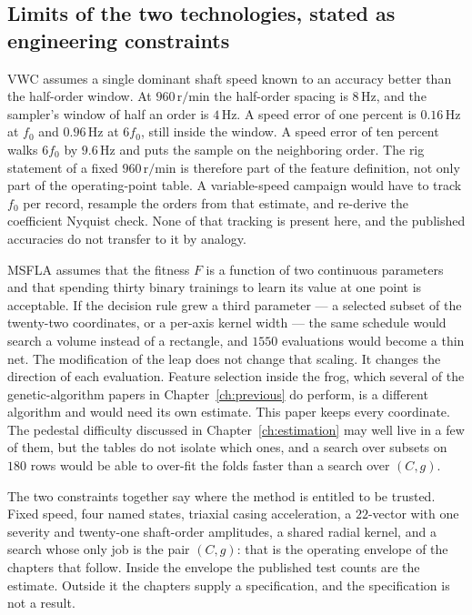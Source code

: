 \subsection{Limits of the two technologies, stated as engineering constraints}

VWC assumes a single dominant shaft speed known to an accuracy better than the half-order window.
At \(960\,\mathrm{r/min}\) the half-order spacing is \(8\,\mathrm{Hz}\), and the sampler's window of half an order is \(4\,\mathrm{Hz}\).
A speed error of one percent is \(0.16\,\mathrm{Hz}\) at \(f_{0}\) and \(0.96\,\mathrm{Hz}\) at \(6f_{0}\), still inside the window.
A speed error of ten percent walks \(6f_{0}\) by \(9.6\,\mathrm{Hz}\) and puts the sample on the neighboring order.
The rig statement of a fixed \(960\,\mathrm{r/min}\) is therefore part of the feature definition, not only part of the operating-point table.
A variable-speed campaign would have to track \(f_{0}\) per record, resample the orders from that estimate, and re-derive the coefficient Nyquist check.
None of that tracking is present here, and the published accuracies do not transfer to it by analogy.

MSFLA assumes that the fitness \(F\) is a function of two continuous parameters and that spending thirty binary trainings to learn its value at one point is acceptable.
If the decision rule grew a third parameter --- a selected subset of the twenty-two coordinates, or a per-axis kernel width --- the same schedule would search a volume instead of a rectangle, and \(1550\) evaluations would become a thin net.
The modification of the leap does not change that scaling.
It changes the direction of each evaluation.
Feature selection inside the frog, which several of the genetic-algorithm papers in Chapter~\ref{ch:previous} do perform, is a different algorithm and would need its own estimate.
This paper keeps every coordinate.
The pedestal difficulty discussed in Chapter~\ref{ch:estimation} may well live in a few of them, but the tables do not isolate which ones, and a search over subsets on \(180\) rows would be able to over-fit the folds faster than a search over \((C, g)\).

The two constraints together say where the method is entitled to be trusted.
Fixed speed, four named states, triaxial casing acceleration, a \(22\)-vector with one severity and twenty-one shaft-order amplitudes, a shared radial kernel, and a search whose only job is the pair \((C, g)\): that is the operating envelope of the chapters that follow.
Inside the envelope the published test counts are the estimate.
Outside it the chapters supply a specification, and the specification is not a result.

